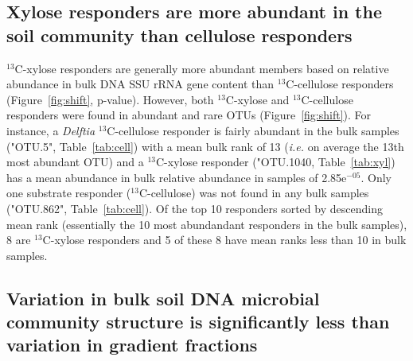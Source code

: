 \subsection{Xylose responders are more abundant in the soil community than cellulose
responders}
$^{13}$C-xylose responders are generally more abundant members based on relative abundance in bulk DNA SSU rRNA gene content than $^{13}$C-cellulose responders (Figure~\ref{fig:shift}, p-value).
However, both $^{13}$C-xylose and $^{13}$C-cellulose responders were found in abundant and 
rare OTUs (Figure~\ref{fig:shift}). For instance, a \textit{Delftia} $^{13}$C-cellulose responder is fairly
abundant in the bulk samples ("OTU.5", Table~\ref{tab:cell}) with a mean bulk rank of 13 (\textit{i.e.} 
on average the 13th most abundant OTU) and a $^{13}$C-xylose responder ("OTU.1040, Table~\ref{tab:xyl}) has
a mean abundance in bulk relative abundance in samples of 2.85e$^{-05}$. Only one substrate
responder ($^{13}$C-cellulose) was not found in any bulk samples ("OTU.862", Table~\ref{tab:cell}). Of the top 10 responders sorted by descending mean rank (essentially the 10 most abundandant responders
in the bulk samples), 8 are $^{13}$C-xylose responders and 5 of these 8 have mean ranks less than
10 in bulk samples.

\subsection{Variation in bulk soil DNA microbial community structure is significantly less
than variation in gradient fractions} 
